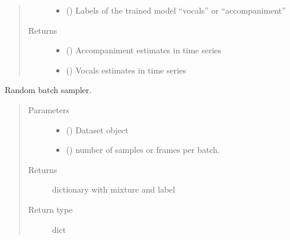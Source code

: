 \documentclass[letterpaper,10pt,english]{sphinxmanual}
\begin{document}
\begin{fulllineitems}
\begin{quote}
\begin{description}
\begin{itemize}
\item {} 
 () \textendash{} Labels of the trained model “vocals” or “accompaniment”

\end{itemize}

\item[{Returns}] \leavevmode
\begin{itemize}
\item {} 
 () \textendash{} Accompaniment estimates in time series

\item {} 
 () \textendash{} Vocals estimates in time series

\end{itemize}


\end{description}\end{quote}

\end{fulllineitems}


\begin{fulllineitems}
\label{\detokenize{docs/source/train:train.train_model.random_batch_sampler}}
Random batch sampler.
\begin{quote}\begin{description}
\item[{Parameters}] \leavevmode\begin{itemize}
\item {} 
 ({\hyperref[\detokenize{docs/source/dataset:dataset.Dataset}]{}}) \textendash{} Dataset object

\item {} 
 () \textendash{} number of samples or frames per batch.

\end{itemize}

\item[{Returns}] \leavevmode
dictionary with mixture and label

\item[{Return type}] \leavevmode
dict

\end{description}\end{quote}

\end{fulllineitems}
\end{document}
